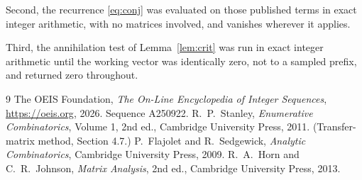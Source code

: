 \documentclass[11pt,a4paper]{article}
\theoremstyle{plain}
\theoremstyle{definition}
\begin{document}
Second, the recurrence \eqref{eq:conj} was evaluated on those published terms in exact
integer arithmetic, with no matrices involved, and vanishes wherever it applies.

Third, the annihilation test of Lemma~\ref{lem:crit} was run in exact integer arithmetic
until the working vector was identically zero, not to a sampled prefix, and returned zero
throughout.

\begin{thebibliography}{9}
 The OEIS Foundation, \emph{The On-Line Encyclopedia of Integer
Sequences}, \url{https://oeis.org}, 2026. Sequence A250922.
 R.~P.~Stanley, \emph{Enumerative Combinatorics}, Volume 1, 2nd ed.,
Cambridge University Press, 2011. (Transfer-matrix method, Section 4.7.)
 P.~Flajolet and R.~Sedgewick, \emph{Analytic Combinatorics}, Cambridge
University Press, 2009.
 R.~A.~Horn and C.~R.~Johnson, \emph{Matrix Analysis}, 2nd ed., Cambridge
University Press, 2013.
\end{thebibliography}
\end{document}
